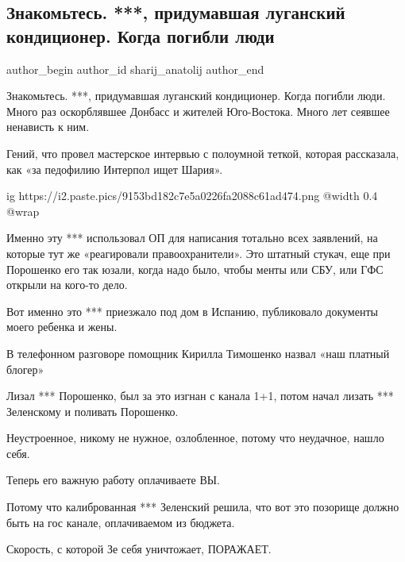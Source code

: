  
 
 
 
 
 
\subsection{Знакомьтесь. ***, придумавшая луганский кондиционер. Когда погибли люди}
\label{sec:15_12_2021.fb.sharij_anatolij.1.ivanov_sergej_rada_video}
 
\ifcmt
 author_begin
   author_id sharij_anatolij
 author_end
\fi

Знакомьтесь. ***, придумавшая луганский кондиционер. Когда погибли люди. Много
раз оскорблявшее Донбасс и жителей Юго-Востока. Много лет сеявшее ненависть к
ним. 

Гений, что провел мастерское интервью с полоумной теткой, которая рассказала,
как «за педофилию Интерпол ищет Шария». 

\ifcmt
  ig https://i2.paste.pics/9153bd182c7e5a0226fa2088c61ad474.png
  @width 0.4
  @wrap 
\fi

Именно эту *** использовал ОП для написания тотально всех заявлений, на которые
тут же «реагировали правоохранители». Это штатный стукач, еще при Порошенко его
так юзали, когда надо было, чтобы менты или СБУ, или ГФС открыли на кого-то
дело. 

Вот именно это *** приезжало под дом в Испанию, публиковало документы моего
ребенка и жены. 

В телефонном разговоре помощник Кирилла Тимошенко назвал «наш платный блогер»

Лизал *** Порошенко, был за это изгнан с канала 1+1, потом начал лизать ***
Зеленскому и поливать Порошенко. 

Неустроенное, никому не нужное, озлобленное, потому что неудачное, нашло себя.  

Теперь его важную работу оплачиваете ВЫ. 

Потому что калиброванная *** Зеленский решила, что вот это позорище должно быть
на гос канале, оплачиваемом из бюджета. 

Скорость, с которой Зе себя уничтожает, ПОРАЖАЕТ.

